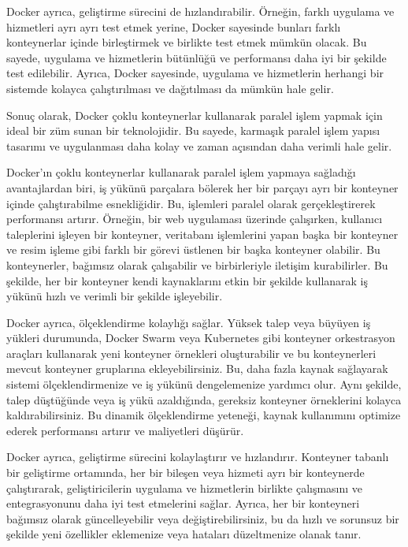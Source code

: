 Docker ayrıca, geliştirme sürecini de hızlandırabilir. Örneğin, farklı uygulama ve hizmetleri ayrı ayrı test etmek yerine, Docker sayesinde bunları farklı konteynerlar içinde birleştirmek ve birlikte test etmek mümkün olacak. Bu sayede, uygulama ve hizmetlerin bütünlüğü ve performansı daha iyi bir şekilde test edilebilir. Ayrıca, Docker sayesinde, uygulama ve hizmetlerin herhangi bir sistemde kolayca çalıştırılması ve dağıtılması da mümkün hale gelir.

Sonuç olarak, Docker çoklu konteynerlar kullanarak paralel işlem yapmak için ideal bir  züm sunan bir teknolojidir. Bu sayede, karmaşık paralel işlem yapısı tasarımı ve uygulanması daha kolay ve zaman açısından daha verimli hale gelir.

Docker'ın çoklu konteynerlar kullanarak paralel işlem yapmaya sağladığı avantajlardan biri, iş yükünü parçalara bölerek her bir parçayı ayrı bir konteyner içinde çalıştırabilme esnekliğidir. Bu, işlemleri paralel olarak gerçekleştirerek performansı artırır. Örneğin, bir web uygulaması üzerinde çalışırken, kullanıcı taleplerini işleyen bir konteyner, veritabanı işlemlerini yapan başka bir konteyner ve resim işleme gibi farklı bir görevi üstlenen bir başka konteyner olabilir. Bu konteynerler, bağımsız olarak çalışabilir ve birbirleriyle iletişim kurabilirler. Bu şekilde, her bir konteyner kendi kaynaklarını etkin bir şekilde kullanarak iş yükünü hızlı ve verimli bir şekilde işleyebilir.

Docker ayrıca, ölçeklendirme kolaylığı sağlar. Yüksek talep veya büyüyen iş yükleri durumunda, Docker Swarm veya Kubernetes gibi konteyner orkestrasyon araçları kullanarak yeni konteyner örnekleri oluşturabilir ve bu konteynerleri mevcut konteyner gruplarına ekleyebilirsiniz. Bu, daha fazla kaynak sağlayarak sistemi ölçeklendirmenize ve iş yükünü dengelemenize yardımcı olur. Aynı şekilde, talep düştüğünde veya iş yükü azaldığında, gereksiz konteyner örneklerini kolayca kaldırabilirsiniz. Bu dinamik ölçeklendirme yeteneği, kaynak kullanımını optimize ederek performansı artırır ve maliyetleri düşürür.

Docker ayrıca, geliştirme sürecini kolaylaştırır ve hızlandırır. Konteyner tabanlı bir geliştirme ortamında, her bir bileşen veya hizmeti ayrı bir konteynerde çalıştırarak, geliştiricilerin uygulama ve hizmetlerin birlikte çalışmasını ve entegrasyonunu daha iyi test etmelerini sağlar. Ayrıca, her bir konteyneri bağımsız olarak güncelleyebilir veya değiştirebilirsiniz, bu da hızlı ve sorunsuz bir şekilde yeni özellikler eklemenize veya hataları düzeltmenize olanak tanır.
